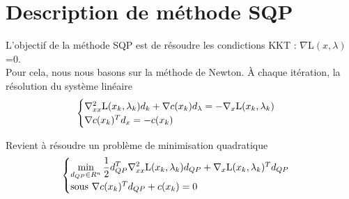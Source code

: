 \section{Description de méthode SQP}\bigbreak


L'objectif de la méthode SQP est de résoudre les condictions KKT : $\nabla$L$(x,\lambda)$=0.\\
Pour cela, nous nous basons sur la méthode de Newton. \`A chaque itération, la résolution du système linéaire\\


\begin{equation*}
\begin{cases}
\nabla_{xx}^2 $L$(x_k,\lambda_k)d_k + \nabla c(x_k)d_{\lambda}=-\nabla_x $L$(x_k,\lambda_k)\\
\nabla c(x_k)^{T} d_x = -c(x_k)
\end{cases}
\end{equation*}

Revient à résoudre un problème de minimisation quadratique \\
\begin{equation*}
\begin{cases}
\displaystyle \min_{d_{QP} \in {R^n}} \frac{1}{2}d_{QP}^{T}\nabla_{xx}^2$L$(x_k,\lambda_k) d_{QP} + 
\nabla_x $L$(x_k,\lambda_k)^{T}d_{QP} \\ $sous   $  \nabla c(x_k)^{T}d_{QP}+c(x_k) = 0
\end{cases}
\end{equation*}


